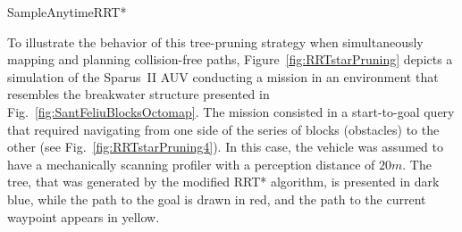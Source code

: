 \begin{algorithm}[H]
	\DontPrintSemicolon

	
    \caption{SampleAnytimeRRT*}
    \label{alg:SampleAnytimeRRT}
\end{algorithm}
\vspace{6pt}

To illustrate the behavior of this tree-pruning strategy when simultaneously
mapping and planning collision-free paths, Figure~\ref{fig:RRTstarPruning}
depicts a simulation of the Sparus~II \ac{AUV} conducting a mission in an
environment that resembles the breakwater structure presented in
Fig.~\ref{fig:SantFeliuBlocksOctomap}. The mission consisted in a start-to-goal
query that required navigating from one side of the series of blocks (obstacles)
to the other (see Fig.~\ref{fig:RRTstarPruning4}). In this case, the vehicle was
assumed to have a mechanically scanning profiler with a perception distance of
$20 m$. The tree, that was generated by the modified \ac{RRT*} algorithm, is
presented in dark blue, while the path to the goal is drawn in red, and the path
to the current waypoint appears in yellow.

